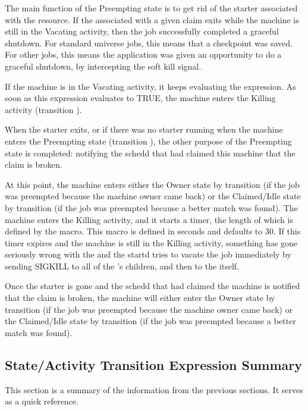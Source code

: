 The main function of the Preempting state is to get rid of the starter
associated with the resource.  If the  associated with
a given claim exits while the machine is still in the Vacating
activity, then the job successfully completed a graceful shutdown.
For standard universe jobs, this means that a checkpoint was saved.
For other jobs, this means the application was given an opportunity to
do a graceful shutdown, by intercepting the soft kill signal.

If the machine is in the Vacating activity, it keeps evaluating the 
 expression.
As soon as this expression evaluates to TRUE,
the machine enters the Killing activity (transition ).

When the starter exits, or if there was no starter running when the
machine enters the Preempting state (transition ),
the other purpose of the Preempting state is completed:
notifying the schedd that had claimed this machine that the claim is
broken.

At this point, the machine enters either the Owner state by
transition  (if the job was preempted because the machine
owner came back) or the Claimed/Idle state by transition 
(if the job was preempted because a better match was found).
The machine enters the Killing activity, and it starts a timer, the
length of which is defined by the 
\label{param:KillingTimeout} macro.
This macro is defined in seconds and defaults to 30.
If this timer expires and the machine is still in
the Killing activity, something has gone seriously wrong with the
 and the startd tries to vacate the job immediately by
sending SIGKILL to all of the 's children, and then to
the  itself.

Once the starter is gone and the schedd that had claimed the
machine is notified that the claim is broken, the machine will either
enter the Owner state by transition  (if the job was
preempted because the machine owner came back) or the Claimed/Idle
state by transition  (if the job was preempted because a
better match was found). 

\subsection{\label{sec:State-Expression-Summary}
State/Activity Transition Expression Summary}
This section is a summary of the information from the
previous sections.
It serves as a quick reference.

